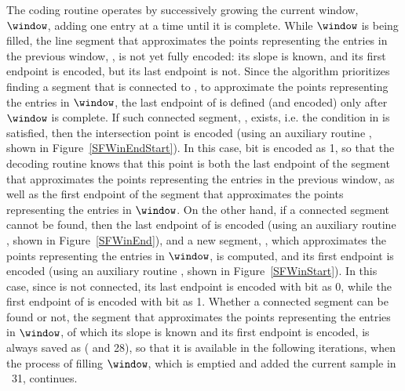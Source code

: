 \vspace{-2pt}



\vspace{-3pt}
The coding routine operates by successively growing the current window, $\window$, adding one entry at a time until it is complete. While $\window$ is being filled, the line segment that approximates the points representing the entries in the previous window, \segmentLastT, is not yet fully encoded: its slope is known, and its first endpoint is encoded, but its last endpoint is not. Since the algorithm prioritizes finding a segment that is connected to \segmentLastT, to approximate the points representing the entries in $\window$, the last endpoint of \segmentLastT is defined (and encoded) only after $\window$ is complete. If such connected segment, \segmentConnT, exists, i.e. the condition in  is satisfied, then the intersection point is encoded (using an auxiliary routine \SFEncodeWinEndStart, shown in Figure~\ref{SFWinEndStart}). In this case, bit \connectedS is encoded as 1, so that the decoding routine knows that this point is both the last endpoint of the segment that approximates the points representing the entries in the previous window, as well as the first endpoint of the segment that approximates the points representing the entries in $\window$. On the other hand, if a connected segment cannot be found, then the last endpoint of \segmentLastT is encoded (using an auxiliary routine \CAWinEnd, shown in Figure~\ref{SFWinEnd}), and a new segment, \segmentS, which approximates the points representing the entries in $\window$, is computed, and its first endpoint is encoded (using an auxiliary routine \CAWinStart, shown in Figure~\ref{SFWinStart}). In this case, since \segmentLastT is not connected, its last endpoint is encoded with bit \connectedS as 0, while the first endpoint of \segmentS is encoded with bit \connectedS as 1. Whether a connected segment can be found or not, the segment that approximates the points representing the entries in $\window$, of which its slope is known and its first endpoint is encoded, is always saved as \segmentLastT ( and 28), so that it is available in the following iterations, when the process of filling $\window$, which is emptied and added the current sample in \Line~31, continues.


\vspace{-2pt}


\clearpage


